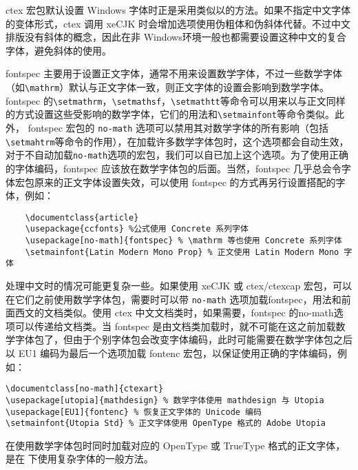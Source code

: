 ctex 宏包默认设置 Windows 字体时正是采用类似以的方法。如果不指定中文字体的变体形式，ctex 调用 xeCJK 时会增加选项使用伪粗体和伪斜体代替。不过中文排版没有斜体的概念，因此在非 Windows环境一般也都需要设置这种中文的复合字体，避免斜体的使用。

fontspec 主要用于设置正文字体，通常不用来设置数学字体，不过一些数学字体（如\verb|\mathrm|）默认与正文字体一致，则正文字体的设置会影响到数学字体。 fontspec 的\verb|\setmathrm|，\verb|\setmathsf|，\verb|\setmathtt|等命令可以用来以与正文同样的方式设置这些受影响的数学字体，它们的用法和\verb|\setmainfont|等命令类似。此外， fontspec 宏包的 \verb|no-math| 选项可以禁用其对数学字体的所有影响（包括\verb|\setmahtrm|等命令的作用），在加载许多数学字体包时，这个选项都会自动生效，对于不自动加载\verb|no-math|选项的宏包，我们可以自已加上这个选项。为了使用正确的字体编码，fontspec 应该放在数学字体包的后面。当然，fontspec 几乎总会令字体宏包原来的正文字体设置失效，可以使用 fontspec 的方式再另行设置搭配的字体，例如：
\begin{lstlisting}
    \documentclass{article}
    \usepackage{ccfonts} %公式使用 Concrete 系列字体
    \usepackage[no-math]{fontspec} % \mathrm 等也使用 Concrete 系列字体
    \setmainfont{Latin Modern Mono Prop} % 正文使用 Latin Modern Mono 字体
\end{lstlisting}

处理中文时的情况可能更复杂一些。如果使用 xeCJK 或 ctex/ctexcap 宏包，可以在它们之前使用数学字体包，需要时可以带 \verb|no-math| 选项加载fontspec，用法和前面西文的文档类似。使用 ctex 中文文档类时，如果需要，fontspec 的no-math选项可以传递给文档类。当 fontspec 是由文档类加载时，就不可能在这之前加载数学字体包了，但由于个别字体包会改变字体编码，此时可能需要在数学字体包之后以 EU1 编码为最后一个选项加载 fontenc 宏包，以保证使用正确的字体编码，例如：
\begin{lstlisting}
\documentclass[no-math]{ctexart}
\usepackage[utopia]{mathdesign} % 数学字体使用 mathdesign 与 Utopia
\usepackage[EU1]{fontenc} % 恢复正文字体的 Unicode 编码
\setmainfont{Utopia Std} % 正文字体使用 OpenType 格式的 Adobe Utopia
\end{lstlisting}

在使用数学字体包时同时加载对应的 OpenType 或 TrueType 格式的正文字体，是在 \XeLaTeX 下使用复杂字体的一般方法。

